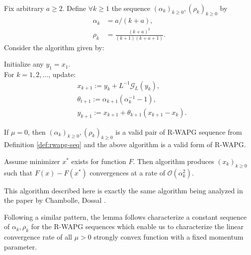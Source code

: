 \documentclass[12pt]{article}
\begin{document}
        \begin{theorem}\label{thm:r-wapg-on-cham-doss}\;\\
            Fix arbitrary $a \ge 2$.
            Define $\forall k \ge 1$ the sequence $(\alpha_k)_{k \ge 0}, (\rho_k)_{k \ge 0}$ by 
            \begin{align*}
                \alpha_k &= a/(k + a), 
                \\
                \rho_k &= \frac{(k + a)^2}{(k + 1)(k + a + 1)}. 
            \end{align*}
            Consider the algorithm given by: 
            \begin{tcolorbox}
                Initialize any $y_1 = x_1$. 
                \\
                For $k = 1, 2, \ldots$, update: 
                \begin{align*}
                    & x_{k + 1} := y_k + L^{-1}\mathcal G_L(y_k), 
                    \\
                    & \theta_{t + 1} := \alpha_{k + 1}(\alpha_k^{-1} - 1),
                    \\
                    & y_{k + 1} := x_{k + 1} + \theta_{k + 1}(x_{k + 1} - x_k). 
                \end{align*}    
            \end{tcolorbox}
            If $\mu = 0$, then $(\alpha_k)_{k \ge 0}, (\rho_k)_{k \ge 0}$ is a valid pair of R-WAPG sequence from Definition \ref{def:rwapg-seq} and the above algorithm is a valid form of R-WAPG. 
            \par
            Assume minimizer $x^*$ exists for function $F$. 
            Then algorithm produces $(x_k)_{k \ge0}$ such that $F(x) - F(x^*)$ convergences at a rate of $\mathcal O(\alpha_k^2)$. 
        \end{theorem}
        \begin{remark}
            This algorithm described here is exactly the same algorithm being analyzed in the paper by Chambolle, Dossal \cite{chambolle_convergence_2015}. 
        \end{remark}
        Following a similar pattern, the lemma follows characterize a constant sequence of $\alpha_k, \rho_k$ for the R-WAPG sequences which enable us to characterize the linear convergence rate of all $\mu > 0$ strongly convex function with a fixed momentum parameter. 
\end{document}
